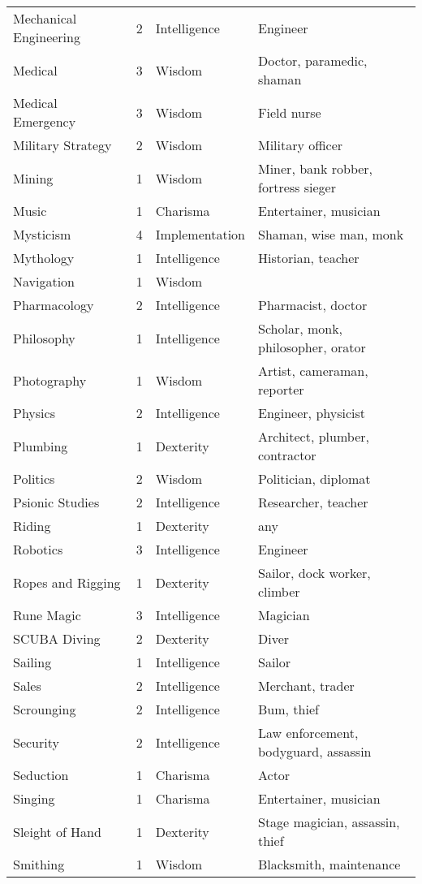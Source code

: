 \documentclass[twoside]{book}
\begin{document}
\begin{longtable}{p{1.25in}llp{12em}}
           \tabularnewline
      \raggedright Mechanical Engineering & 2 & Intelligence & Engineer \tabularnewline
      \raggedright Medical & 3 & Wisdom & Doctor, paramedic, shaman
           \tabularnewline
      \raggedright Medical Emergency & 3 & Wisdom & Field nurse \tabularnewline
      \raggedright Military Strategy & 2 & Wisdom & Military officer \tabularnewline
      \raggedright Mining & 1 & Wisdom & Miner, bank robber,
           fortress sieger \tabularnewline
      \raggedright Music & 1 & Charisma & Entertainer, musician
           \tabularnewline
      \raggedright Mysticism & 4 & Implementation & Shaman, wise man, monk
           \tabularnewline
      \raggedright Mythology & 1 & Intelligence & Historian, teacher
           \tabularnewline
      \raggedright Navigation & 1 & Wisdom \tabularnewline
      \raggedright Pharmacology & 2 & Intelligence & Pharmacist, doctor
           \tabularnewline
      \raggedright Philosophy & 1 & Intelligence & Scholar, monk,
           philosopher, orator \tabularnewline
      \raggedright Photography & 1 & Wisdom & Artist, cameraman,
           reporter \tabularnewline
      \raggedright Physics & 2 & Intelligence & Engineer, physicist
           \tabularnewline
      \raggedright Plumbing & 1 & Dexterity & Architect, plumber,
           contractor \tabularnewline
      \raggedright Politics & 2 & Wisdom & Politician, diplomat
           \tabularnewline
      \raggedright Psionic Studies & 2 & Intelligence & Researcher, teacher
           \tabularnewline
      \raggedright Riding & 1 & Dexterity & any \tabularnewline
      \raggedright Robotics & 3 & Intelligence & Engineer \tabularnewline
      \raggedright Ropes and Rigging & 1 & Dexterity & Sailor, dock worker,
           climber \tabularnewline
      \raggedright Rune Magic & 3 & Intelligence & Magician \tabularnewline
      \raggedright SCUBA Diving & 2 & Dexterity & Diver \tabularnewline
      \raggedright Sailing & 1 & Intelligence & Sailor \tabularnewline
      \raggedright Sales & 2 & Intelligence & Merchant, trader \tabularnewline
      \raggedright Scrounging & 2 & Intelligence & Bum, thief \tabularnewline
      \raggedright Security & 2 & Intelligence & Law enforcement,
           bodyguard, assassin \tabularnewline
      \raggedright Seduction & 1 & Charisma & Actor \tabularnewline
      \raggedright Singing & 1 & Charisma & Entertainer, musician
           \tabularnewline
      \raggedright Sleight of Hand & 1 & Dexterity & Stage magician, assassin,
           thief \tabularnewline
      \raggedright Smithing & 1 & Wisdom & Blacksmith, maintenance

\end{longtable}
\end{document}

